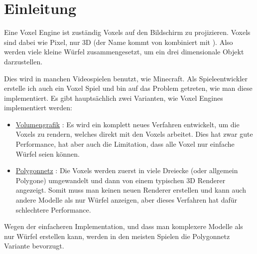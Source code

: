\section{Einleitung}

Eine Voxel Engine ist zuständig Voxels auf den
Bildschirm zu projizieren. Voxels sind dabei wie
Pixel, nur 3D (der Name  kommt von
 kombiniert mit ).
Also werden viele kleine Würfel zusammengesetzt,
um ein drei dimensionale Objekt darzustellen.

Dies wird in manchen Videospielen benutzt, wie
Minecraft. Als Spieleentwickler erstelle ich auch
ein Voxel Spiel und bin auf das Problem getreten,
wie man diese implementiert.
Es gibt hauptsächlich zwei Varianten,
wie Voxel Engines implementiert werden:

\begin{itemize}
	\item \href{https://de.wikipedia.org/wiki/Volumengrafik}{Volumengrafik} \cite{wiki_volume}:
	Es wird ein komplett neues Verfahren entwickelt,
	um die Voxels zu rendern, welches direkt mit
	den Voxels arbeitet. Dies hat zwar gute
	Performance, hat aber auch die Limitation,
	dass alle Voxel nur einfache Würfel seien können.

	\item \href{https://de.wikipedia.org/wiki/Polygonnetz}{Polygonnetz} \cite{wiki_poly}:
	Die Voxels werden zuerst in viele
	Dreiecke (oder allgemein Polygone) umgewandelt
	und dann von einem typischen 3D Renderer angezeigt.
	Somit muss man keinen neuen Renderer erstellen und
	kann auch andere Modelle als nur Würfel anzeigen,
	aber dieses Verfahren hat dafür schlechtere
	Performance.
\end{itemize}

Wegen der einfacheren Implementation, und dass man
komplexere Modelle als nur Würfel erstellen kann,
werden in den meisten Spielen die Polygonnetz
Variante bevorzugt.

